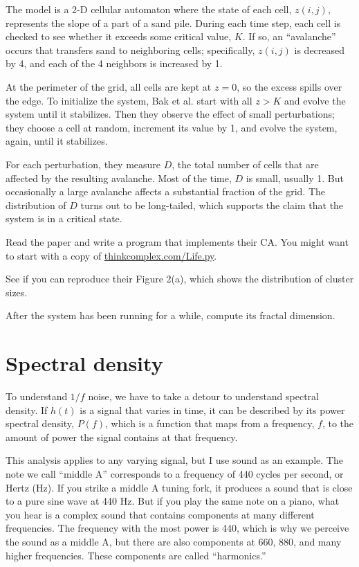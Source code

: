 \documentclass[10pt]{book}
\begin{document}
The model is a 2-D cellular automaton where the state of each cell,
$z(i,j)$, represents the slope of a part of a sand pile.  During each
time step, each cell is checked to see whether it exceeds some
critical value, $K$.  If so, an ``avalanche'' occurs that transfers
sand to neighboring cells; specifically, $z(i,j)$ is decreased by 4,
and each of the 4 neighbors is increased by 1.

At the perimeter of the grid, all cells are kept at $z=0$, so
the excess spills over the edge.  To initialize the system,
Bak et al. start with all $z > K$ and evolve the system until
it stabilizes.  Then they observe the effect of small perturbations;
they choose a cell at random, increment its value
by 1, and evolve the system, again, until it stabilizes.

For each perturbation, they measure $D$, the total number
of cells that are affected by the resulting avalanche.  Most of
the time, $D$ is small, usually 1.  But occasionally
a large avalanche affects a substantial fraction
of the grid.  The distribution of $D$ turns out to be long-tailed,
which supports the claim that the system is in a critical state.

\begin{exercise}

Read the paper and write a program that implements their CA.
You might want to start with a copy of
\url{thinkcomplex.com/Life.py}.

See if you can reproduce their Figure 2(a), which shows the
distribution of cluster sizes.

After the system has been running for a while, compute its
fractal dimension.

\end{exercise}


\section{Spectral density}

To understand $1/f$ noise, we have to take a detour to understand
spectral density.  If $h(t)$ is a signal that varies in time, it can
be described by its power spectral density, $P(f)$, which is a
function that maps from a frequency, $f$, to the amount of power the
signal contains at that frequency.

This analysis applies to any varying signal, but I use sound as
an example.  The note we call ``middle A'' corresponds to a frequency
of 440 cycles per second, or Hertz (Hz).  If you strike a middle A
tuning fork, it produces a sound that is close to a pure sine wave at
440 Hz.  But if you play the same note on a piano, what you hear is
a complex sound that contains components at many different
frequencies.  The frequency with the most power is 440, which is why
we perceive the sound as a middle A, but there are also components at
660, 880, and many higher frequencies.  These components are called
``harmonics.''
\end{document}
